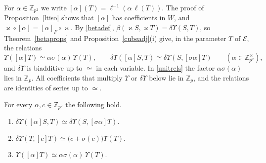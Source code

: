 For $\alpha\in\mathbb Z_{p^2}$ we write $[\alpha](T)=\ell^{-1}(\alpha\,\ell(T))$. The proof of Proposition~\ref{ltiso} shows that $[\alpha]$ has coefficients in $W$, and $\varkappa\circ[\alpha]=[\alpha]_F\circ\varkappa$. By \eqref{betadef}, $\beta(\varkappa S,\varkappa T)=\delta\Upsilon(S,T)$, so Theorem~\ref{betaprops} and Proposition~\ref{cubeadj}(i) give, in the parameter $T$ of $\mathcal E$, the relations
\begin{equation}\label{unitrels}
\Upsilon([\alpha]T)\simeq\alpha\sigma(\alpha)\,\Upsilon(T),\qquad\delta\Upsilon([\alpha]S,T)\simeq\delta\Upsilon(S,[\sigma\alpha]T)\qquad(\alpha\in\mathbb Z_{p^2}^\times),
\end{equation}
and $\delta\Upsilon$ is biadditive up to $\simeq$ in each variable. In \eqref{unitrels} the factor $\alpha\sigma(\alpha)$ lies in $\mathbb Z_p$. All coefficients that multiply $\Upsilon$ or $\delta\Upsilon$ below lie in $\mathbb Z_p$, and the relations are identities of series up to $\simeq$.

\begin{lemma}\label{allalpha}
For every $\alpha,c\in\mathbb Z_{p^2}$ the following hold.
\begin{enumerate}
\item[(i)] $\delta\Upsilon([\alpha]S,T)\simeq\delta\Upsilon(S,[\sigma\alpha]T)$.
\item[(ii)] $\delta\Upsilon(T,[c]T)\simeq\big(c+\sigma(c)\big)\Upsilon(T)$.
\item[(iii)] $\Upsilon([\alpha]T)\simeq\alpha\sigma(\alpha)\,\Upsilon(T)$.
\end{enumerate}
\end{lemma}

